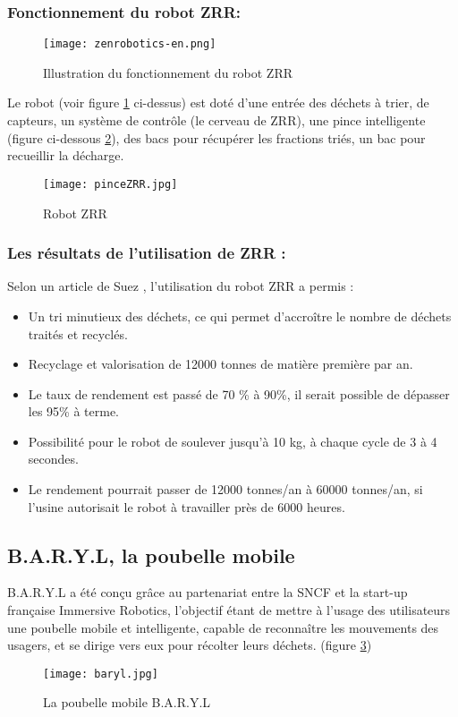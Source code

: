 \documentclass[a4paper,12pt]{report}
\begin{document}
\subsubsection*{Fonctionnement du robot ZRR:}
\begin {figure}[H]
\begin{center} \texttt{[image: zenrobotics-en.png]}
\caption{Illustration du fonctionnement du robot ZRR \cite{ref13}}
\label{zrr}
\end{center}
\end{figure}
Le robot (voir figure \ref{zrr} ci-dessus) est doté d'une entrée des déchets à trier, de capteurs, un système de contrôle (le cerveau de ZRR), une pince intelligente (figure ci-dessous \ref{pince}), des bacs pour récupérer les fractions triés, un bac pour recueillir la décharge.
\begin {figure}[H]
\begin{center} \texttt{[image: pinceZRR.jpg]}
\caption{Robot ZRR \cite{ref14}}
\label{pince}
\end{center}
\end{figure}
\subsubsection*{Les résultats de l'utilisation de ZRR :}
Selon un article de Suez \cite{ref12}, l'utilisation du robot ZRR a permis :
\begin{itemize}
\item Un tri minutieux des déchets, ce qui permet d’accroître le nombre de déchets traités et recyclés.
\item Recyclage et valorisation de 12000 tonnes de matière première par an.
\item Le taux de rendement est passé de 70 \% à 90\%, il serait possible de dépasser les 95\% à terme.
\item Possibilité pour le robot de soulever jusqu'à 10 kg, à chaque cycle de 3 à 4 secondes.
\item Le rendement pourrait passer de 12000 tonnes/an à 60000 tonnes/an, si l'usine autorisait le robot à travailler près de 6000 heures.
\end{itemize}
\subsection{B.A.R.Y.L, la poubelle mobile}
B.A.R.Y.L a été conçu grâce au partenariat entre la SNCF et la start-up française Immersive Robotics, l'objectif étant de mettre à l'usage des utilisateurs une poubelle mobile et intelligente, capable de reconnaître les mouvements des usagers, et se dirige vers eux pour récolter leurs déchets. (figure \ref{baryl})\\
\begin {figure}[H]
\begin{center} \texttt{[image: baryl.jpg]}
\caption{La poubelle mobile B.A.R.Y.L \cite{ref15}}
\label{baryl}
\end{center}
\end{figure}
\end{document}
